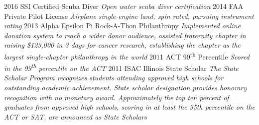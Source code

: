 \documentclass[print]{gunn-resume}
\begin{document}
\begin{entrylist}
\entry
    {2016}
    {SSI Certified Scuba Diver}
    {}
    {\emph{Open water scuba diver certification}
    }
  \entry
    {2014}
    {FAA Private Pilot License}
    {}
    {\emph{Airplane single-engine land, spin rated, pursuing instrument rating}}
  \entry
    {2013}
    {Alpha Epsilon Pi Rock-A-Thon Philanthropy}
    {}
    {\emph{Implemented online donation system to reach a wider donor audience, assisted  fraternity chapter in raising \$123,000 in 3 days for cancer research, establishing the chapter as the largest single-chapter philanthropy in the world}}
  \entry
    {2011}
    {ACT 99\textsuperscript{th} Percentile}
    {}
    {\emph{Scored in the 99\textsuperscript{th} percentile on the ACT}}
    \entry
    {2011}
    {ISAC Illinois State Scholar}
    {}
    {\emph{The State Scholar Program recognizes students attending approved high schools for outstanding academic achievement. State scholar designation provides honorary recognition with no monetary award. Approximately the top ten percent of graduates from approved high schools, scoring in at least the 95th percentile on the ACT or SAT, are announced as State Scholars}}
\end{entrylist}
\end{document}
